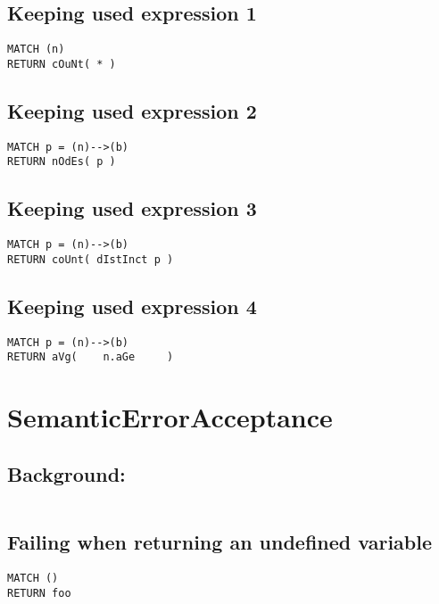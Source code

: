 \subsection{Keeping used expression 1}

\begin{lstlisting}
MATCH (n)
RETURN cOuNt( * )
\end{lstlisting}

\subsection{Keeping used expression 2}

\begin{lstlisting}
MATCH p = (n)-->(b)
RETURN nOdEs( p )
\end{lstlisting}

\subsection{Keeping used expression 3}

\begin{lstlisting}
MATCH p = (n)-->(b)
RETURN coUnt( dIstInct p )
\end{lstlisting}

\subsection{Keeping used expression 4}

\begin{lstlisting}
MATCH p = (n)-->(b)
RETURN aVg(    n.aGe     )
\end{lstlisting}
\section{SemanticErrorAcceptance}


\subsection{Background:}

\begin{lstlisting}
\end{lstlisting}

\subsection{Failing when returning an undefined variable}

\begin{lstlisting}
MATCH ()
RETURN foo
\end{lstlisting}

